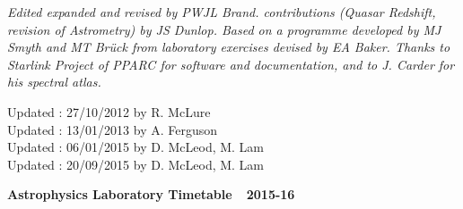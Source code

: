 \documentclass[12pt]{article}
\begin{document}
{\vspace*{0.5cm}

{\small\sl
Edited expanded and revised by PWJL Brand.
contributions (Quasar Redshift, 
revision of Astrometry) by JS Dunlop. 
Based on a programme developed by MJ Smyth and MT Br\"{u}ck from laboratory
exercises devised by EA Baker. Thanks to
Starlink Project of PPARC for software and documentation, and to J. Carder
for his spectral atlas.
}

\noindent
{\small
Updated : 27/10/2012 by R. McLure\\
Updated : 13/01/2013 by A. Ferguson\\
Updated : 06/01/2015 by D. McLeod, M. Lam\\
Updated : 20/09/2015 by D. McLeod, M. Lam\\
}
}

\newpage



\begin{center}
{\Large {\bf Astrophysics Laboratory Timetable\ \ 2015-16}}\\
\end{center}

\medskip
\end{document}
